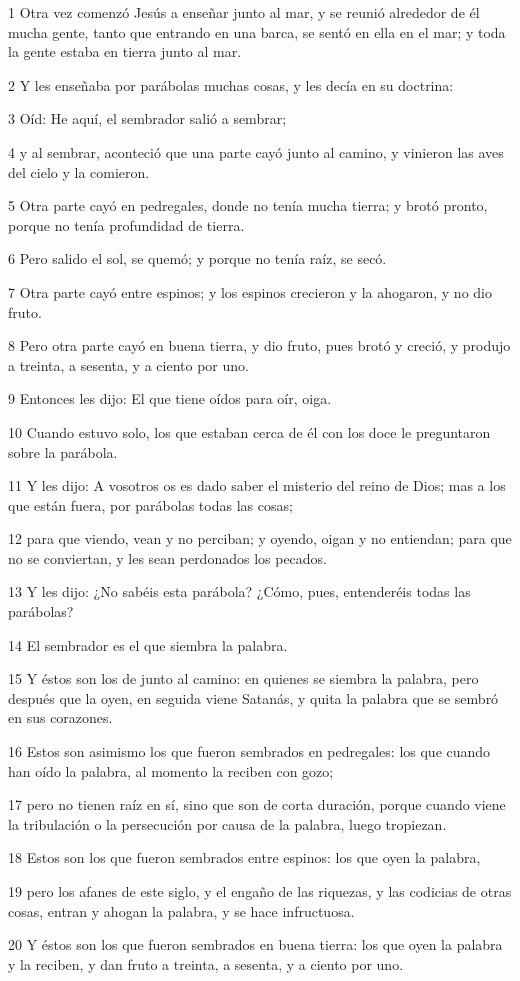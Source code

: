 \par 1 Otra vez comenzó Jesús a enseñar junto al mar, y se reunió alrededor de él mucha gente, tanto que entrando en una barca, se sentó en ella en el mar; y toda la gente estaba en tierra junto al mar.
\par 2 Y les enseñaba por parábolas muchas cosas, y les decía en su doctrina:
\par 3 Oíd: He aquí, el sembrador salió a sembrar;
\par 4 y al sembrar, aconteció que una parte cayó junto al camino, y vinieron las aves del cielo y la comieron.
\par 5 Otra parte cayó en pedregales, donde no tenía mucha tierra; y brotó pronto, porque no tenía profundidad de tierra.
\par 6 Pero salido el sol, se quemó; y porque no tenía raíz, se secó.
\par 7 Otra parte cayó entre espinos; y los espinos crecieron y la ahogaron, y no dio fruto.
\par 8 Pero otra parte cayó en buena tierra, y dio fruto, pues brotó y creció, y produjo a treinta, a sesenta, y a ciento por uno.
\par 9 Entonces les dijo: El que tiene oídos para oír, oiga.
\par 10 Cuando estuvo solo, los que estaban cerca de él con los doce le preguntaron sobre la parábola.
\par 11 Y les dijo: A vosotros os es dado saber el misterio del reino de Dios; mas a los que están fuera, por parábolas todas las cosas;
\par 12 para que viendo, vean y no perciban; y oyendo, oigan y no entiendan; para que no se conviertan, y les sean perdonados los pecados.
\par 13 Y les dijo: ¿No sabéis esta parábola? ¿Cómo, pues, entenderéis todas las parábolas?
\par 14 El sembrador es el que siembra la palabra.
\par 15 Y éstos son los de junto al camino: en quienes se siembra la palabra, pero después que la oyen, en seguida viene Satanás, y quita la palabra que se sembró en sus corazones.
\par 16 Estos son asimismo los que fueron sembrados en pedregales: los que cuando han oído la palabra, al momento la reciben con gozo;
\par 17 pero no tienen raíz en sí, sino que son de corta duración, porque cuando viene la tribulación o la persecución por causa de la palabra, luego tropiezan.
\par 18 Estos son los que fueron sembrados entre espinos: los que oyen la palabra,
\par 19 pero los afanes de este siglo, y el engaño de las riquezas, y las codicias de otras cosas, entran y ahogan la palabra, y se hace infructuosa.
\par 20 Y éstos son los que fueron sembrados en buena tierra: los que oyen la palabra y la reciben, y dan fruto a treinta, a sesenta, y a ciento por uno.

